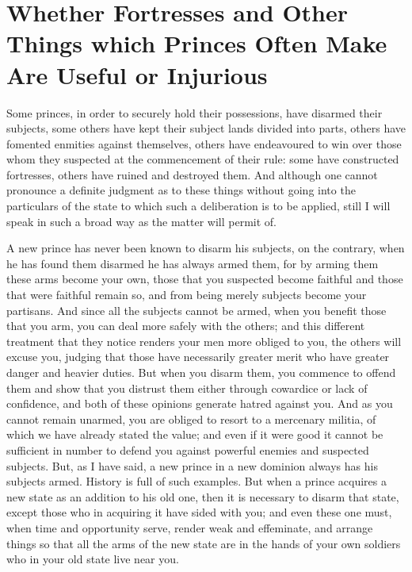 \documentclass[12pt,letterpaper]{memoir}
\begin{document}
\chapter{Whether Fortresses and Other Things which Princes Often Make Are Useful or Injurious}

Some princes, in order to securely hold their possessions, have
disarmed their subjects, some others have kept their subject lands
divided into parts, others have fomented enmities against themselves,
others have endeavoured to win over those whom they suspected at the
commencement of their rule: some have constructed fortresses, others
have ruined and destroyed them. And although one cannot pronounce a
definite judgment as to these things without going into the particulars
of the state to which such a deliberation is to be applied, still I
will speak in such a broad way as the matter will permit of.

A new prince has never been known to disarm his subjects, on the
contrary, when he has found them disarmed he has always armed them, for
by arming them these arms become your own, those that you suspected
become faithful and those that were faithful remain so, and from being
merely subjects become your partisans. And since all the subjects
cannot be armed, when you benefit those that you arm, you can deal more
safely with the others; and this different treatment that they notice
renders your men more obliged to you, the others will excuse you,
judging that those have necessarily greater merit who have greater
danger and heavier duties. But when you disarm them, you commence to
offend them and show that you distrust them either through cowardice or
lack of confidence, and both of these opinions generate hatred against
you. And as you cannot remain unarmed, you are obliged to resort to a
mercenary militia, of which we have already stated the value; and even
if it were good it cannot be sufficient in number to defend you against
powerful enemies and suspected subjects. But, as I have said, a new
prince in a new dominion always has his subjects armed. History is full
of such examples. But when a prince acquires a new state as an addition
to his old one, then it is necessary to disarm that state, except those
who in acquiring it have sided with you; and even these one must, when
time and opportunity serve, render weak and effeminate, and arrange
things so that all the arms of the new state are in the hands of your
own soldiers who in your old state live near you.
\end{document}
